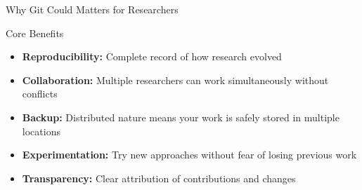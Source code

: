 \documentclass[aspectratio=1609]{beamer}
\begin{document}
\begin{frame}{ Why Git Could Matters for Researchers}
    \begin{tblock}{Core Benefits}
        \begin{itemize}
        \item \textbf{Reproducibility:} Complete record of how research evolved
        \item \textbf{Collaboration:} Multiple researchers can work simultaneously without conflicts
        \item \textbf{Backup:} Distributed nature means your work is safely stored in multiple locations
        \item \textbf{Experimentation:} Try new approaches without fear of losing previous work
        \item \textbf{Transparency:} Clear attribution of contributions and changes
    \end{itemize}
    \end{tblock}
\end{frame}




\end{document}
